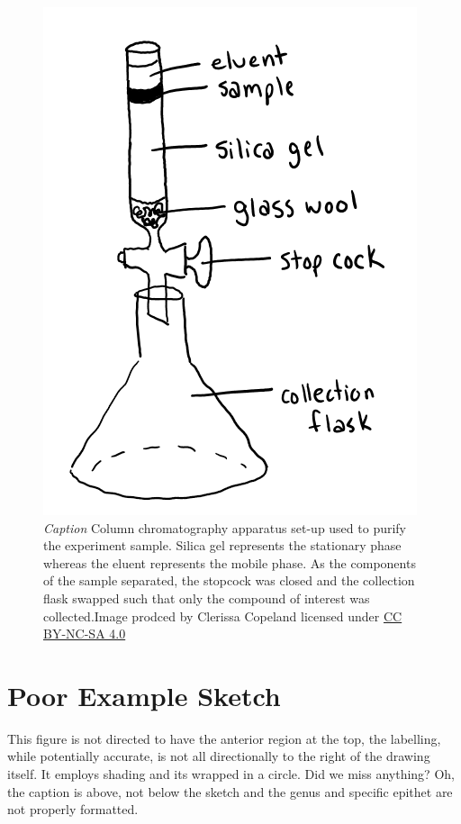 \documentclass[
]{book}
\begin{document}
\begin{figure}
\centering
\includegraphics{images/JSSG_good-journal-style-fig-2.png}
\caption{\emph{Caption} Column chromatography apparatus set-up used to purify the experiment sample. Silica gel represents the stationary phase whereas the eluent represents the mobile phase. As the components of the sample separated, the stopcock was closed and the collection flask swapped such that only the compound of interest was collected.Image prodced by Clerissa Copeland licensed under \href{https://creativecommons.org/licenses/by-nc-sa/4.0/}{CC BY-NC-SA 4.0}}
\end{figure}

\hypertarget{poor-example-sketch}{%
\section{Poor Example Sketch}\label{poor-example-sketch}}

This figure is not directed to have the anterior region at the top, the labelling, while potentially accurate, is not all directionally to the right of the drawing itself. It employs shading and it\textquotesingle s wrapped in a circle. Did we miss anything? Oh, the caption is above, not below the sketch and the genus and specific epithet are not properly formatted.
\end{document}
